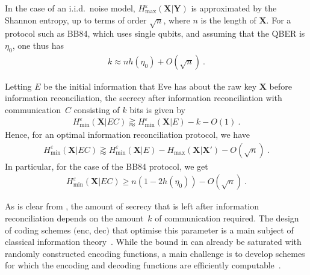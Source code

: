 In the case of an i.i.d.\ noise model, $H^{\varepsilon}_{\max}(\mathbf{X} | \mathbf{Y})$ is approximated by the Shannon entropy, up to terms of order $\sqrt{n}$, where $n$ is the length of $\mathbf{X}$. For a protocol such as BB84, which uses single qubits, and assuming that the QBER is $\eta_0$, one thus has
\begin{align}
  k \approx n h(\eta_0) + O(\sqrt{n}) \ .
\end{align}

Letting $E$ be the initial information that Eve has about the raw key $\mathbf{X}$ before information reconciliation, the secrecy after information reconciliation with communication~$C$ consisting of $k$ bits is given by
\begin{align} \label{eq:secreduction}
  H_{\min}^{\varepsilon}(\mathbf{X} | E C) \gtrapprox H_{\min}^{\varepsilon}(\mathbf{X} | E) - k - O(1) \ .
\end{align}
Hence, for an optimal information reconciliation protocol, we have 
\begin{align}
  H_{\min}^{\varepsilon}(\mathbf{X} | E C) \gtrapprox H_{\min}^{\varepsilon}(\mathbf{X} | E) - H_{\max}(\mathbf{X} | \mathbf{X'}) - O(\sqrt{n}) \ .
\end{align}
In particular, for the case of the BB84 protocol, we get 
\begin{align}
  H_{\min}^\varepsilon(\mathbf{X} | E C)  \geq n (1- 2 h(\eta_0)) - O(\sqrt{n}) \ .
\end{align}

As is clear from , the amount of secrecy that is left after information reconciliation  depends on the amount~$k$ of  communication required. The design of coding schemes  $(\mathrm{enc}$, $\mathrm{dec})$ that optimise this parameter is a main subject of classical information theory~\cite{CT12}. While the bound in  can already be saturated with randomly constructed encoding functions, a main challenge is to develop schemes for which the encoding and decoding functions are efficiently computable~\cite{LABZG08,ELAB09,EMM11,JK14}.

